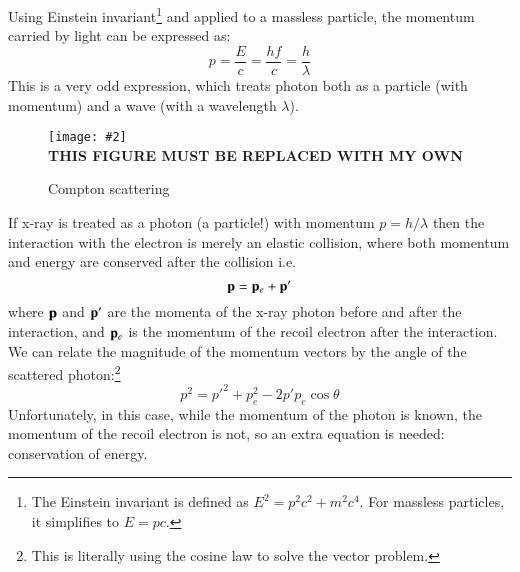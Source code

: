 \documentclass[11pt]{article}
\newcommand{\pic}[2]{\texttt{[image: \#2]}}
\newcommand{\mb}[1]{\ensuremath\mathbf{#1}}
\begin{document}
Using Einstein invariant\footnote{The Einstein invariant is defined as
  $E^2=p^2c^2+m^2c^4$. For massless particles, it simplifies to $E=pc$.} and
applied to a massless particle, the momentum carried by light can be expressed
as:
\begin{equation}
  \boxed{p=\frac{E}{c}=\frac{hf}{c}=\frac{h}{\lambda}}
  \label{eq:momentum-wavelength}
\end{equation}
This is a very odd expression, which treats photon both as a particle (with
momentum) and a wave (with a wavelength $\lambda$).
\begin{figure}[ht]
  \centering
  \pic{.5}{../compton2.png}\\
  \textbf{THIS FIGURE MUST BE REPLACED WITH MY OWN}
  \caption{Compton scattering}
  \label{fig:compton-scattering}
\end{figure}
If x-ray is treated as a photon (a particle!) with momentum $p=h/\lambda$ then
the interaction with the electron is merely an elastic collision, where both
momentum and energy are conserved after the collision i.e.
\begin{equation}
  \mb{p}=\mb{p}_e+\mb{p}'
\end{equation}
where $\mb{p}$ and $\mb{p}'$ are the momenta of the x-ray photon before and
after the interaction, and $\mb{p}_e$ is the momentum of the recoil electron
after the interaction. We can relate the magnitude of the momentum vectors by
the angle of the scattered photon:\footnote{This is literally using the cosine
  law to solve the vector problem.}
\begin{equation}
  p^2=p'^2+p_e^2 -2p'p_e\cos\theta
\end{equation}
Unfortunately, in this case, while the momentum of the photon is known, the
momentum of the recoil electron is not, so an extra equation is needed:
conservation of energy.
\end{document}
